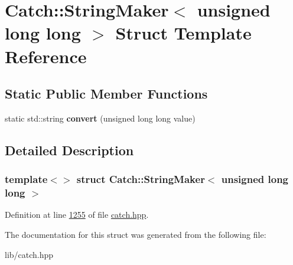 \hypertarget{structCatch_1_1StringMaker_3_01unsigned_01long_01long_01_4}{}\section{Catch\+::String\+Maker$<$ unsigned long long $>$ Struct Template Reference}
\label{structCatch_1_1StringMaker_3_01unsigned_01long_01long_01_4}
\subsection*{Static Public Member Functions}
\begin{DoxyCompactItemize}
\item 
\mbox{\label{structCatch_1_1StringMaker_3_01unsigned_01long_01long_01_4_a6a8708af4fc8df3f52d7eab779b6bc6f}} 
static std\+::string {\bfseries convert} (unsigned long long value)
\end{DoxyCompactItemize}


\subsection{Detailed Description}
\subsubsection*{template$<$$>$\newline
struct Catch\+::\+String\+Maker$<$ unsigned long long $>$}



Definition at line \mbox{\hyperlink{catch_8hpp_source_l01255}{1255}} of file \mbox{\hyperlink{catch_8hpp_source}{catch.\+hpp}}.



The documentation for this struct was generated from the following file\+:\begin{DoxyCompactItemize}
\item 
lib/catch.\+hpp\end{DoxyCompactItemize}
